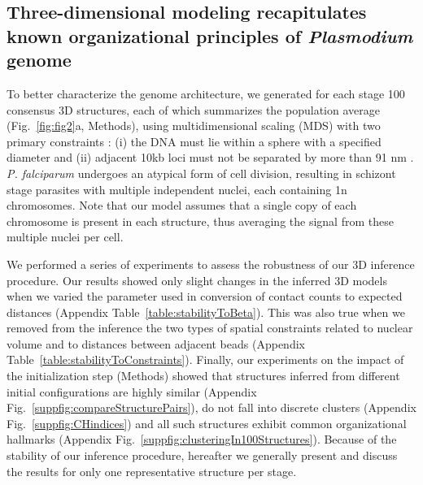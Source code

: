 \subsection{Three-dimensional modeling recapitulates known organizational principles of {\em Plasmodium} genome}

To better characterize the genome architecture, we generated for each stage
100 consensus 3D structures, each of which summarizes the population average
(Fig.~\ref{fig:fig2}a, Methods), using multidimensional scaling (MDS) with two
primary constraints \citep{duan:three}: (i) the DNA must lie within a sphere
with a specified diameter \citep{bannister:making, weiner:3d} and (ii)
adjacent 10kb loci must not be separated by more than 91 nm
\citep{bystricky:long-range}. \emph{P. falciparum} undergoes an atypical form
of cell division, resulting in schizont stage parasites with multiple
independent nuclei, each containing 1n chromosomes. Note that our model
assumes that a single copy of each chromosome is present in each structure,
thus averaging the signal from these multiple nuclei per cell.


We performed a series of experiments to assess the robustness of our 3D
inference procedure.  Our results showed only slight changes in the inferred
3D models when we varied the parameter used in conversion of contact counts to
expected distances (Appendix Table~\ref{table:stabilityToBeta}). This
was also true when we removed from the inference the two types of spatial
constraints related to nuclear volume and to distances between adjacent beads
(Appendix Table~\ref{table:stabilityToConstraints}). Finally, our
experiments on the impact of the initialization step (Methods) showed that
structures inferred from different initial configurations are highly similar
(Appendix Fig.~\ref{suppfig:compareStructurePairs}), do not fall into
discrete clusters (Appendix Fig.~\ref{suppfig:CHindices}) and all such
structures exhibit common organizational hallmarks (Appendix
Fig.~\ref{suppfig:clusteringIn100Structures}). Because of the stability of
our inference procedure, hereafter we generally present and discuss the
results for only one representative structure per stage.

